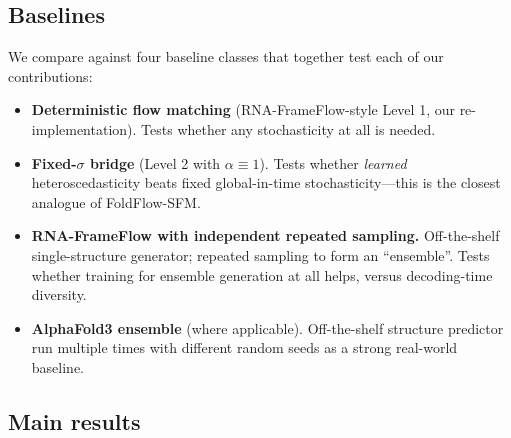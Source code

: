 \documentclass{article}
\theoremstyle{remark}
\theoremstyle{definition}
\begin{document}
\subsection{Baselines}
\label{subsec:exp-baselines}

We compare against four baseline classes that together test each of our
contributions:

\begin{itemize}[leftmargin=1.6em,itemsep=1pt,topsep=2pt]
\item \textbf{Deterministic flow matching} (RNA-FrameFlow-style Level 1, our
re-implementation). Tests whether any stochasticity at all is needed.

\item \textbf{Fixed-$\sigma$ bridge} (Level 2 with $\alpha\equiv 1$). Tests
whether \emph{learned} heteroscedasticity beats fixed global-in-time
stochasticity---this is the closest analogue of FoldFlow-SFM.

\item \textbf{RNA-FrameFlow with independent repeated sampling.} Off-the-shelf
single-structure generator; repeated sampling to form an ``ensemble''. Tests
whether training for ensemble generation at all helps, versus decoding-time
diversity.

\item \textbf{AlphaFold3 ensemble} (where applicable). Off-the-shelf
structure predictor run multiple times with different random seeds as a
strong real-world baseline.
\end{itemize}

\subsection{Main results}
\label{subsec:exp-main}
\end{document}
